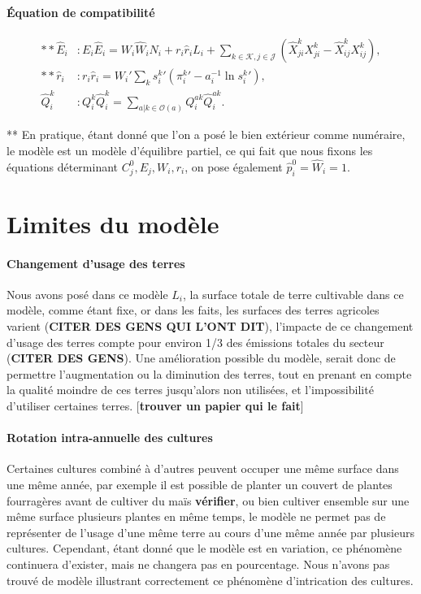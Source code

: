 \paragraph{Équation de compatibilité}
\begin{align}
    ** \hat{E}_i & : E_i \hat{E}_i = W_i \hat{W}_i N_i + r_i \hat{r}_i L_i + \sum_{k \in \mathcal{K},j \in \mathcal{J}} \left(\hat{X}_{ji}^k X_{ji}^k - \hat{X}_{ij}^k X_{ij}^k \right), \\
    ** \hat{r}_i & : r_i \hat{r}_i = W_i\prime \sum_k {s_i^k}\prime \left( {\pi_i^k}\prime -a_i^{-1} \ln {s_i^k}\prime\right),                                                           \\
    \hat{Q}_i^k  & : Q_i^k \hat{Q}_i^k = \sum_{a|k\in \mathcal{O}(a)} Q_i^{ak} \hat{Q}_i^{ak}.
\end{align}

** En pratique, étant donné que l’on a posé le bien extérieur comme numéraire, le modèle est un modèle d’équilibre partiel, ce qui fait que nous fixons les équations déterminant $C_j^0, E_j, W_i, r_i$, on pose également $\hat{p}_i^0=\hat{W}_i=1$.



\section{Limites du modèle}

\paragraph{Changement d’usage des terres} Nous avons posé dans ce modèle $L_i$, la surface totale de terre cultivable dans ce modèle, comme étant fixe, or dans les faits, les surfaces des terres agricoles varient (\textbf{CITER DES GENS QUI L’ONT DIT}), l’impacte de ce changement d’usage des terres compte pour environ 1/3 des émissions totales du secteur (\textbf{CITER DES GENS}). Une amélioration possible du modèle, serait donc de permettre l’augmentation ou la diminution des terres, tout en prenant en compte la qualité moindre de ces terres jusqu’alors non utilisées, et l’impossibilité d’utiliser certaines terres. [\textbf{trouver un papier qui le fait}]

\paragraph{Rotation intra-annuelle des cultures} Certaines cultures combiné à d’autres peuvent occuper une même surface dans une même année, par exemple il est possible de planter un couvert de plantes fourragères avant de cultiver du maïs \textbf{vérifier}, ou bien cultiver ensemble sur une même surface plusieurs plantes en même temps, le modèle ne permet pas de représenter de l’usage d’une même terre au cours d’une même année par plusieurs cultures. Cependant, étant donné que le modèle est en variation, ce phénomène continuera d’exister, mais ne changera pas en pourcentage. Nous n’avons pas trouvé de modèle illustrant correctement ce phénomène d’intrication des cultures.

